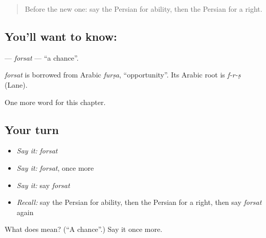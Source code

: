 \label{lesson:FA-C89-forsat}



\begin{quote}
Before the new one: say the Persian for ability, then the Persian for a right.
\end{quote}

\subsection*{You'll want to know: }
\textbf{} — \emph{forsat} — \textquotedblleft{}a chance\textquotedblright{}.

\begin{cousinweb}
\emph{forsat} is borrowed from Arabic \emph{furṣa}, \textquotedblleft{}opportunity\textquotedblright{}. Its Arabic root is \emph{f-r-ṣ} (Lane).
\end{cousinweb}

\begin{grammarlens}[title={What you've built}]
One more word for this chapter.
\end{grammarlens}

\subsection*{Your turn}
\begin{itemize}
\raggedright
  \item \emph{Say it:} \emph{forsat}
  \item \emph{Say it:} \emph{forsat}, once more
  \item \emph{Say it:} say \emph{forsat}
  \item \emph{Recall:} say the Persian for ability, then the Persian for a right, then say \emph{forsat} again
\end{itemize}

\begin{tcolorbox}[breakable,colback=teal!4,colframe=teal!35!black,title={Before you move on}]
What does  mean? (\textquotedblleft{}A chance\textquotedblright{}.) Say it once more.
\end{tcolorbox}
